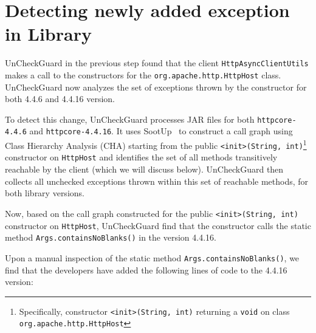 
\section{Detecting newly added exception in Library} 

UnCheckGuard in the previous step found that the client \texttt{HttpAsyncClientUtils} makes a call to the constructors for the \texttt{org.apache.http.HttpHost} class. UnCheckGuard now analyzes the set of exceptions thrown by the constructor for both 4.4.6 and 4.4.16 version.

To detect this change, UnCheckGuard processes JAR files for both \texttt{httpcore-4.4.6} and \texttt{httpcore-4.4.16}. It uses SootUp~\cite{Karakaya24:_sootup} to construct a call graph using Class Hierarchy Analysis (CHA) starting from the public \texttt{<init>(String, int)}\footnote{Specifically, constructor \texttt{<init>(String, int)} returning a \texttt{void} on class \texttt{org.apache.http.HttpHost}} constructor on \texttt{HttpHost} and identifies the set of all methods transitively reachable by the client (which we will discuss below). UnCheckGuard then collects all unchecked exceptions thrown within this set of reachable methods, for both library versions.

Now, based on the call graph constructed for the public \texttt{<init>(String, int)} constructor on \texttt{HttpHost}, UnCheckGuard find that the constructor calls the static method \texttt{Args.containsNoBlanks()} in the version 4.4.16.


Upon a manual inspection of the static method \texttt{Args.containsNoBlanks()}, we find that the developers have added the following lines of code to the 4.4.16 version:

